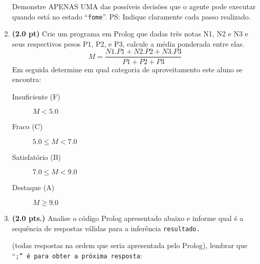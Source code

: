 \documentclass[a4paper,11pt]{article}
\begin{document}
\begin{enumerate}
Demonstre APENAS UMA das possíveis decisões que o agente pode executar quando está no estado ``{\tt fome}''. PS: Indique claramente cada passo realizado.

\begin{comment}
\begin{tabular}{ll}
 \hline \hline
    1. &  $\forall y \exists x ( pessoa(y) \wedge pet(x) \wedge vacinado(x) \rightarrow ama(y, x) )$ \\
    2. &  $ \forall x ( pet(x) \wedge saudavel(x) \rightarrow vacinado(x) ) $ \\
    3. &  $ pessoa(mickey) $ \\
    4. &  $ pet(pluto) $ \\
    5. &  $saudavel(pluto)$ \\
    \hline \hline
 \end{tabular}

 Na sequência abaixo, resolva as seguintes questões:
\begin{enumerate}
\setlength{\itemsep}{-3pt}
\item {\bf (1.0 pt)} Interprete textualmente o significado de cada fórmula acima
\item {\bf (2.0 pts)} Utilizando as propriedades da LPO, PU's, PE's e regras de inferências, deduza se {\it Mickey} ama {\it Pluto}.
\end{enumerate}
\end{comment}


\item {\bf (2.0 pt)} Crie um programa em Prolog que dadas três notas N1, N2 e N3 e seus respectivos pesos P1, P2, e P3, calcule a média ponderada entre elas. $$M = \frac{N1.P1 + N2.P2 + N3.P3}{P1+P2+P3}$$ Em seguida determine em qual categoria de aproveitamento este aluno se encontra: 

\begin{description}
\item [Insuficiente (F)] $M < 5.0$
\item [Fraco (C)] $5.0 \leq M < 7.0$
\item [Satisfatório (B)] $7.0 \leq M < 9.0$
\item [Destaque (A)] $M \geq 9.0$
\end{description}

\newpage 

\item {\bf (2.0 pts.)} Analise o código Prolog apresentado abaixo e informe qual é  a sequência de respostas válidas para a inferência {\tt resultado.} 
{\small (todas respostas na ordem que seria apresentada pelo Prolog), lembrar
que ``\texttt{;'' \/ é para obter a próxima resposta}:

}
\end{enumerate}
\end{document}
